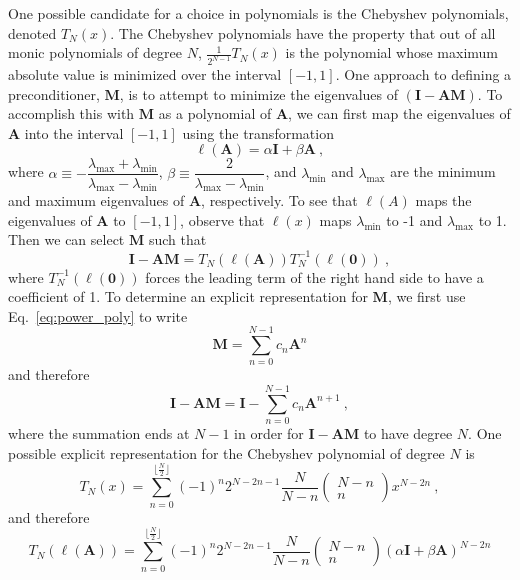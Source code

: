 \documentclass[10pt]{article}
\newcommand{\bA}{\ensuremath{\mathbf{A}}}
\newcommand{\bM}{\ensuremath{\mathbf{M}}}
\newcommand{\bI}{\ensuremath{\mathbf{I}}}
\begin{document}
One possible candidate for a choice in polynomials is the
Chebyshev polynomials, denoted $T_N(x)$.
The Chebyshev polynomials have the property
that out of all monic polynomials of degree $N$,
$\frac{1}{2^{N-1}} T_N(x)$ is the polynomial whose maximum
absolute value is minimized over the interval $[-1,1]$.
One approach to defining a preconditioner, $\bM$, is to
attempt to minimize the eigenvalues of $\left( \bI - \bA \bM \right)$.
To accomplish this with $\bM$ as a polynomial of $\bA$, we can
first map the eigenvalues of $\bA$ into the interval $[-1,1]$
using the transformation
\begin{equation}
\ell (\bA) = \alpha \bI + \beta \bA \:,
\end{equation}
where $\alpha  \equiv -\dfrac{\lambda_\text{max} + \lambda_\text{min}}
{\lambda_\text{max} -  \lambda_\text{min}}$,
$\beta \equiv \dfrac{2}{\lambda_\text{max} -  \lambda_\text{min}}$,
and $\lambda_\text{min}$ and $\lambda_\text{max}$ are the
minimum and maximum eigenvalues of $\bA$, respectively.
To see that $\ell(A)$ maps the eigenvalues of $\bA$ to $[-1,1]$,
observe that $\ell(x)$ maps $\lambda_\text{min}$ to -1 and
$\lambda_\text{max}$ to 1.
Then we can select $\bM$ such that
\begin{equation}
\bI - \bA \bM  =
T_N \left( \ell(\bA) \right) T_N^{-1} \left( \ell(\mathbf{0}) \right) \:, \label{eq:cheby_prec}
\end{equation}
where $T_N^{-1} \left( \ell(\mathbf{0}) \right)$ forces the leading
term of the right hand side to have a coefficient of 1.
To determine an explicit representation for $\bM$, we first
use Eq.~\eqref{eq:power_poly} to write
\begin{equation}
\bM = \sum_{n=0}^{N-1} c_n \bA^n
\end{equation}
and therefore
\begin{equation}
\bI - \bA \bM = \bI - \sum_{n=0}^{N-1} c_n \bA^{n+1} \:, \label{eq:poly_prec}
\end{equation}
where the summation ends at $N-1$ in order for $\bI - \bA \bM$ to have
degree $N$.
One possible explicit representation for the Chebyshev polynomial of degree $N$ is
\begin{equation}
T_N(x) = \sum_{n=0}^{\lfloor \frac{N}{2} \rfloor} \left( -1 \right)^n 2^{N - 2n -1} \frac{N}{N-n}
\begin{pmatrix} N-n \\ n \end{pmatrix} x^{N-2n} \:,
\end{equation}
and therefore
\begin{equation}
T_N \left( \ell(\bA) \right) = \sum_{n=0}^{\lfloor \frac{N}{2} \rfloor} \left( -1 \right)^n 2^{N - 2n -1} \frac{N}{N-n}
\begin{pmatrix} N-n \\ n \end{pmatrix} \left( \alpha \bI + \beta \bA \right)^{N-2n}
\end{equation}
\end{document}
